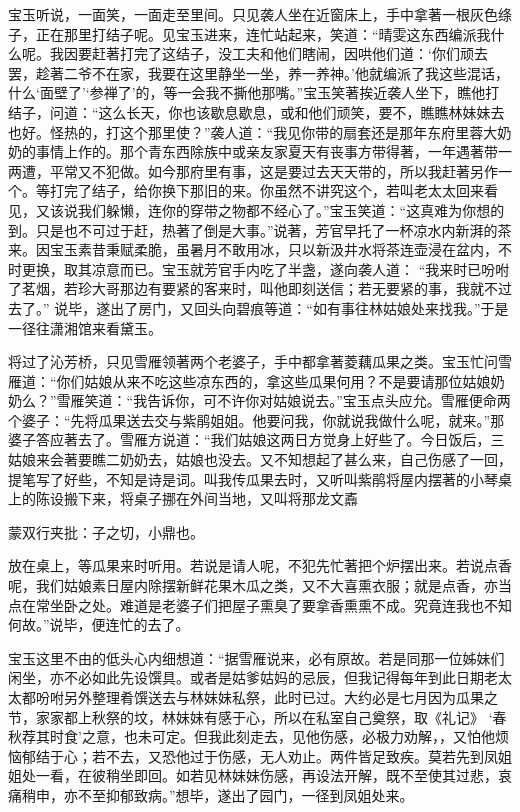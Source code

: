 \begin{parag}
    宝玉听说，一面笑，一面走至里间。只见袭人坐在近窗床上，手中拿著一根灰色绦子，正在那里打结子呢。见宝玉进来，连忙站起来，笑道：“晴雯这东西编派我什么呢。我因要赶著打完了这结子，没工夫和他们瞎闹，因哄他们道：‘你们顽去罢，趁著二爷不在家，我要在这里静坐一坐，养一养神。’他就编派了我这些混话，什么‘面壁了’‘参禅了’的，等一会我不撕他那嘴。”宝玉笑著挨近袭人坐下，瞧他打结子，问道：“这么长天，你也该歇息歇息，或和他们顽笑，要不，瞧瞧林妹妹去也好。怪热的，打这个那里使？”袭人道：“我见你带的扇套还是那年东府里蓉大奶奶的事情上作的。那个青东西除族中或亲友家夏天有丧事方带得著，一年遇著带一两遭，平常又不犯做。如今那府里有事，这是要过去天天带的，所以我赶著另作一个。等打完了结子，给你换下那旧的来。你虽然不讲究这个，若叫老太太回来看见，又该说我们躲懒，连你的穿带之物都不经心了。”宝玉笑道：“这真难为你想的到。只是也不可过于赶，热著了倒是大事。”说著，芳官早托了一杯凉水内新湃的茶来。因宝玉素昔秉赋柔脆，虽暑月不敢用冰，只以新汲井水将茶连壶浸在盆内，不时更换，取其凉意而已。宝玉就芳官手内吃了半盏，遂向袭人道： “我来时已吩咐了茗烟，若珍大哥那边有要紧的客来时，叫他即刻送信；若无要紧的事，我就不过去了。” 说毕，遂出了房门，又回头向碧痕等道：“如有事往林姑娘处来找我。”于是一径往潇湘馆来看黛玉。
\end{parag}


\begin{parag}
    将过了沁芳桥，只见雪雁领著两个老婆子，手中都拿著菱藕瓜果之类。宝玉忙问雪雁道：“你们姑娘从来不吃这些凉东西的，拿这些瓜果何用？不是要请那位姑娘奶奶么？”雪雁笑道：“我告诉你，可不许你对姑娘说去。”宝玉点头应允。雪雁便命两个婆子：“先将瓜果送去交与紫鹃姐姐。他要问我，你就说我做什么呢，就来。”那婆子答应著去了。雪雁方说道：“我们姑娘这两日方觉身上好些了。今日饭后，三姑娘来会著要瞧二奶奶去，姑娘也没去。又不知想起了甚么来，自己伤感了一回，提笔写了好些，不知是诗是词。叫我传瓜果去时，又听叫紫鹃将屋内摆著的小琴桌上的陈设搬下来，将桌子挪在外间当地，又叫将那龙文鼒\begin{note}蒙双行夹批：子之切，小鼎也。\end{note}放在桌上，等瓜果来时听用。若说是请人呢，不犯先忙著把个炉摆出来。若说点香呢，我们姑娘素日屋内除摆新鲜花果木瓜之类，又不大喜熏衣服；就是点香，亦当点在常坐卧之处。难道是老婆子们把屋子熏臭了要拿香熏熏不成。究竟连我也不知何故。”说毕，便连忙的去了。
\end{parag}


\begin{parag}
    宝玉这里不由的低头心内细想道：“据雪雁说来，必有原故。若是同那一位姊妹们闲坐，亦不必如此先设馔具。或者是姑爹姑妈的忌辰，但我记得每年到此日期老太太都吩咐另外整理肴馔送去与林妹妹私祭，此时已过。大约必是七月因为瓜果之节，家家都上秋祭的坟，林妹妹有感于心，所以在私室自己奠祭，取《礼记》 ‘春秋荐其时食’之意，也未可定。但我此刻走去，见他伤感，必极力劝解，，又怕他烦恼郁结于心；若不去，又恐他过于伤感，无人劝止。两件皆足致疾。莫若先到凤姐姐处一看，在彼稍坐即回。如若见林妹妹伤感，再设法开解，既不至使其过悲，哀痛稍申，亦不至抑郁致病。”想毕，遂出了园门，一径到凤姐处来。
\end{parag}


